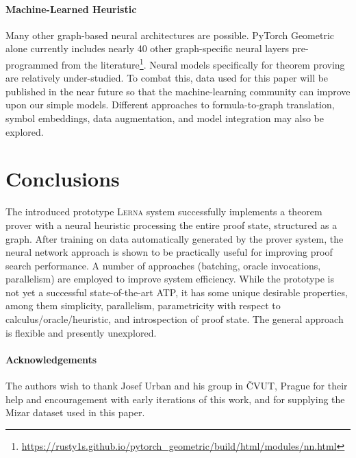 \documentclass{llncs}
\newcommand{\lerna}{\textsc{Lerna}}
\begin{document}
\paragraph{Machine-Learned Heuristic}
Many other graph-based neural architectures are possible.
PyTorch Geometric alone currently includes nearly 40 other graph-specific neural layers pre-programmed from the literature\footnote{\url{https://rusty1s.github.io/pytorch_geometric/build/html/modules/nn.html}}.
Neural models specifically for theorem proving are relatively under-studied.
To combat this, data used for this paper will be published in the near future so that the machine-learning community can improve upon our simple models.
Different approaches to formula-to-graph translation, symbol embeddings, data augmentation, and model integration may also be explored.

\section{Conclusions}
The introduced prototype \lerna{} system successfully implements a theorem prover with a neural heuristic processing the entire proof state, structured as a graph.
After training on data automatically generated by the prover system, the neural network approach is shown to be practically useful for improving proof search performance.
A number of approaches (batching, oracle invocations, parallelism) are employed to improve system efficiency.
While the prototype is not yet a successful state-of-the-art ATP, it has some unique desirable properties, among them simplicity, parallelism, parametricity with respect to calculus/oracle/heuristic, and introspection of proof state.
The general approach is flexible and presently unexplored.

\paragraph{Acknowledgements}
The authors wish to thank Josef Urban and his group in \v{C}VUT, Prague for their help and encouragement with early iterations of this work, and for supplying the Mizar dataset used in this paper.



\end{document}

